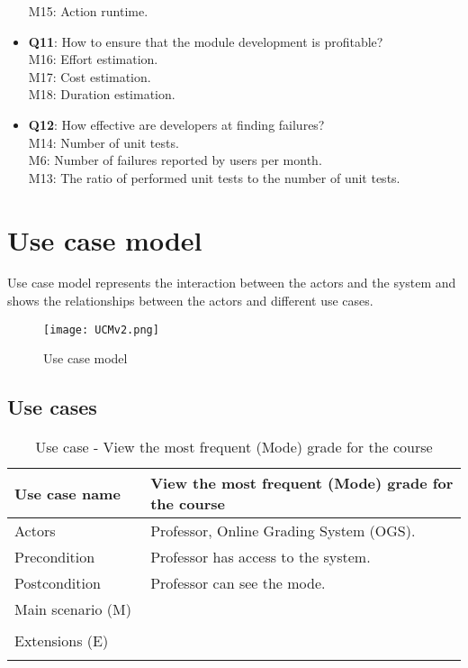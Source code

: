 \documentclass[12pt]{article}
\newcommand\tabularhead[1]{
\begin{table}[h]
  \caption{Use case - #1}
  \begin{tabular}{|p{0.3\linewidth}|p{0.7\linewidth}|}
    \hline
    \textbf{Use case name} & \textbf{#1} \\
    \hline}
\newcommand\addrow[2]{#1 &#2\\ \hline}
\newcommand\adddoublerow[2]{\begin{minipage}[t][][t]{2.5cm}#1\end{minipage}%
    &\begin{minipage}[t][][t]{\linewidth}
     \begin{itemize}\setlength{\itemsep}{0pt}%
        #2     
     \end{itemize}
     \end{minipage}\\ \hline}
\newcommand\addmulrow[2]{ \begin{minipage}[t][][t]{2.5cm}#1\end{minipage}%
     &\begin{minipage}[t][][t]{\linewidth}
      \begin{enumerate}\setlength{\itemsep}{0pt}%
        #2   
      \end{enumerate}
      \end{minipage}\\ \hline}
\newenvironment{usecase}{\tabularhead}
{\hline\end{tabular}\end{table}}
\begin{document}
\begin{itemize}
     M15: Action runtime.
    \item \textbf{Q11}: How to ensure that the module development is profitable?\\
     M16: Effort estimation.\\
     M17: Cost estimation.\\
     M18: Duration estimation.
    \item \textbf{Q12}: How effective are developers at finding failures?\\
     M14: Number of unit tests.\\
     M6: Number of failures reported by users per month.\\
     M13: The ratio of performed unit tests to the number of unit tests. 
\end{itemize}
\newpage
\section{Use case model}
Use case model represents the interaction between the actors and the system and shows the relationships between the actors and different use cases.\cite{UCM}
\begin{figure}[h]
\centering
\texttt{[image: UCMv2.png]}
\caption{Use case model}
\end{figure}
\newpage
\subsection{Use cases}

\begin{usecase}{View the most frequent (Mode) grade for the course}
    \addrow{Actors}{Professor, Online Grading System (OGS).}
    \addrow{Precondition}{Professor has access to the system.}
    \addrow{Postcondition}{Professor can see the mode.}
    \addmulrow{Main scenario (M)}{
        \item Professor logins to the system.
        \item The system shows the list of available courses.
        \item Professor chooses the course to view.
        \item The system shows the statistics of the course.
        \item Professor views the mode of the course.\\
    }
    \adddoublerow{Extensions (E)}{
        \item[] 1.1. Professor entered the wrong credentials.
        \item[] 1.2. Go to 1.\\
    }
\end{usecase}
\end{document}
